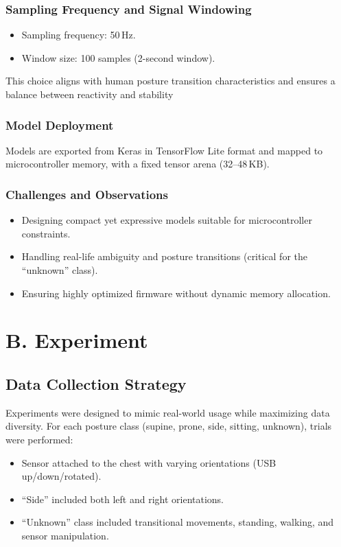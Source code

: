 \documentclass[12pt]{article}
\begin{document}
\subsubsection*{Sampling Frequency and Signal Windowing}
\begin{itemize}
    \item Sampling frequency: 50\,Hz.
    \item Window size: 100 samples (2-second window).
\end{itemize}
This choice aligns with human posture transition characteristics and ensures a balance between reactivity and stability

\subsubsection*{Model Deployment}
Models are exported from Keras in TensorFlow Lite format and mapped to microcontroller memory, with a fixed tensor arena (32--48\,KB).

\subsubsection*{Challenges and Observations}
\begin{itemize}
    \item Designing compact yet expressive models suitable for microcontroller constraints.
    \item Handling real-life ambiguity and posture transitions (critical for the ``unknown'' class).
    \item Ensuring highly optimized firmware without dynamic memory allocation.
\end{itemize}

\section*{B. Experiment}

\subsection*{Data Collection Strategy}
Experiments were designed to mimic real-world usage while maximizing data diversity. For each posture class (supine, prone, side, sitting, unknown), trials were performed:

\begin{itemize}
    \item Sensor attached to the chest with varying orientations (USB up/down/rotated).
    \item ``Side'' included both left and right orientations.
    \item ``Unknown'' class included transitional movements, standing, walking, and sensor manipulation.
\end{itemize}
\end{document}
